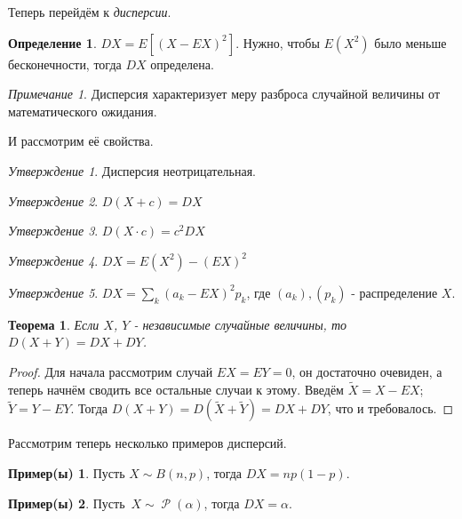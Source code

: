 \documentclass[a4paper,100pt]{article}
\theoremstyle{indented}
\newtheorem{theorem}{Теорема}
\theoremstyle{definition}
\newtheorem{defn}{Определение}
\newtheorem{exl}{Пример(ы)}
\theoremstyle{remark}
\newtheorem{remark}{Примечание}
\newtheorem{stat}{Утверждение}
\DeclareMathOperator{\Rho}{\mathcal{P}}
\begin{document}
Теперь перейдём к \textit{дисперсии}. 

\begin{defn}
    $DX = E[(X-EX)^2]$. Нужно, чтобы $E(X^2)$ было меньше бесконечности, тогда $DX$ определена.
\end{defn}

\begin{remark}
    Дисперсия характеризует меру разброса случайной величины от математического ожидания.
\end{remark}

И рассмотрим её свойства. 

\begin{stat}
    Дисперсия неотрицательная.
\end{stat}

\begin{stat}
    $D(X+c)=DX$
\end{stat}

\begin{stat}
    $D(X\cdot c)=c^2 DX$
\end{stat}

\begin{stat}
    $DX = E(X^2) - (EX)^2$
\end{stat}

\begin{stat}
    $DX=\sum_k(a_k- EX)^2p_k$, где $(a_k), (p_k)$ - распределение $X$. 
\end{stat}

\begin{theorem}
    Если $X$, $Y$ - независимые случайные величины, то $D(X+Y)=DX+DY$. 
\end{theorem}

\begin{proof}
    Для начала рассмотрим случай $EX=EY=0$, он достаточно очевиден, а теперь начнём сводить все остальные случаи к этому. Введём $\tilde{X}=X-EX$; $\tilde{Y}=Y-EY$. Тогда $D(X+Y)=D(\tilde{X}+\tilde{Y})=DX+DY$, что и требовалось.
\end{proof}

Рассмотрим теперь несколько примеров дисперсий.

\begin{exl}
    Пусть $X\sim B(n, p)$, тогда $DX=np(1-p)$. 
\end{exl}

\begin{exl}
    Пусть $X\sim \Rho(\alpha)$, тогда $DX = \alpha$. 
\end{exl}
\end{document}

